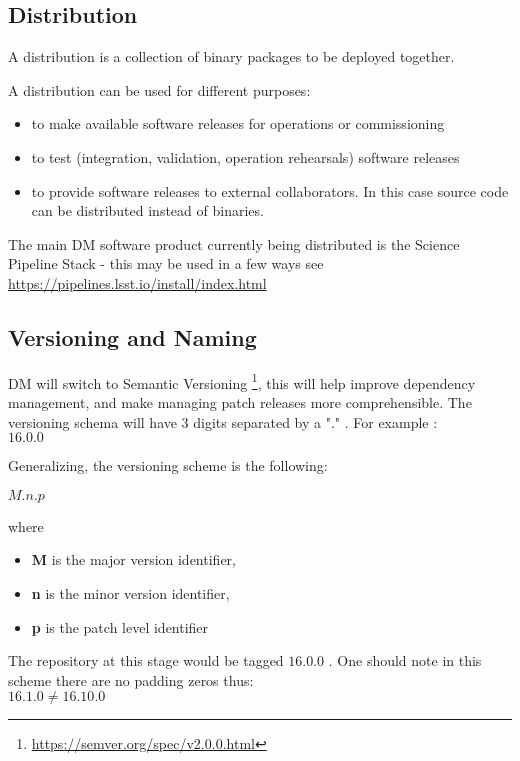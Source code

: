 \subsection{Distribution} \label{sec:distribution}

A distribution is a collection of binary packages to be deployed together.

A distribution can be used for different purposes:

\begin{itemize}
\item to make available software releases for operations or commissioning
\item to test (integration, validation, operation rehearsals) software releases
\item to provide software releases to external collaborators. In this case source code can be distributed instead of binaries.
\end{itemize}

The main DM software product currently being distributed is the Science Pipeline Stack -
this may be used in a few ways see \url{https://pipelines.lsst.io/install/index.html}


\newpage
\subsection{Versioning and Naming} \label{sec:versioning}
DM will  switch to Semantic Versioning \footnote{\url{https://semver.org/spec/v2.0.0.html}},  this will help improve dependency management, and make  managing patch releases more comprehensible.
The versioning schema will have 3 digits separated by a "." . For example :
\\
$16.0.0$

Generalizing, the versioning scheme is the following:

$M.n.p$

where 

\begin{itemize}
\item {\bf M} is the major version identifier,
\item {\bf n} is the minor version identifier,
\item {\bf p} is the patch level identifier
\end{itemize}

The repository at this stage would be tagged $16.0.0$ .
One should note in this scheme there are no padding zeros thus:
\\
$16.1.0   \neq 16.10.0$

